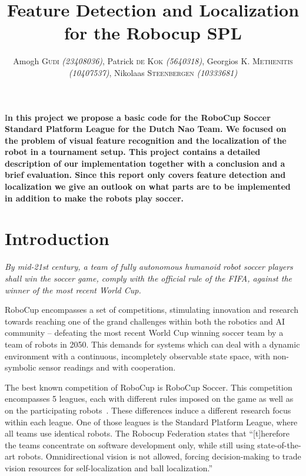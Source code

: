 \documentclass[	DIV=calc,%
							paper=a4,%
							fontsize=9pt,%
							twocolumn]{scrartcl}	 					%
\title{Feature Detection and Localization for the Robocup SPL}					%
\author{Amogh \textsc{Gudi} {\small\emph{(23408036)}}, Patrick \textsc{de Kok} {\small\emph{(5640318)}},
        Georgios \textsc{K. Methenitis} {\small\emph{(10407537)}},
		Nikolaas \textsc{Steenbergen} {\small\emph{(10333681)}}\\}											%
\newcommand{\initial}[1]{%
     \lettrine[lines=3,lhang=0.3,nindent=0em]{
     				\color{DarkGoldenrod}
     				{\textsf{#1}}}{}}
\begin{document}
\maketitle
\thispagestyle{fancy} 			%
\initial{I}\textbf{n this project we propose a basic code for the RoboCup Soccer Standard Platform League for the Dutch Nao Team. We focused on the problem of visual feature recognition and the localization of the robot in a tournament setup. This project contains a detailed description of our implementation together with a conclusion and a brief evaluation. Since this report only covers feature detection and localization we give an outlook on what parts are to be implemented in addition to make the robots play soccer.}

\section{Introduction}
\textit{By mid-21st century, a team of fully autonomous humanoid robot soccer players shall win the soccer game, comply with the official rule of the FIFA, against the winner of the most recent World Cup.} 


\hspace{3mm}

RoboCup encompasses a set of competitions, stimulating innovation and research towards reaching one of the grand challenges within both the robotics and AI community -- defeating the most recent World Cup winning soccer team by a team of robots in 2050.  This demands for systems which can deal with a dynamic environment with a continuous, incompletely observable state space, with non-symbolic sensor readings and with cooperation.

The best known competition of RoboCup is RoboCup Soccer.  This competition encompasses 5 leagues, each with different rules imposed on the game as well as on the participating robots~\cite{RoboCupSTL}.  These differences induce a different research focus within each league.  One of those leagues is the Standard Platform League, where all teams use identical robots.  The Robocup Federation states that ``[t]herefore the teams concentrate on software development only, while still using state-of-the-art robots. Omnidirectional vision is not allowed, forcing decision-making to trade vision resources for self-localization and ball localization.''~\cite{RoboCupSTL}
\end{document}
